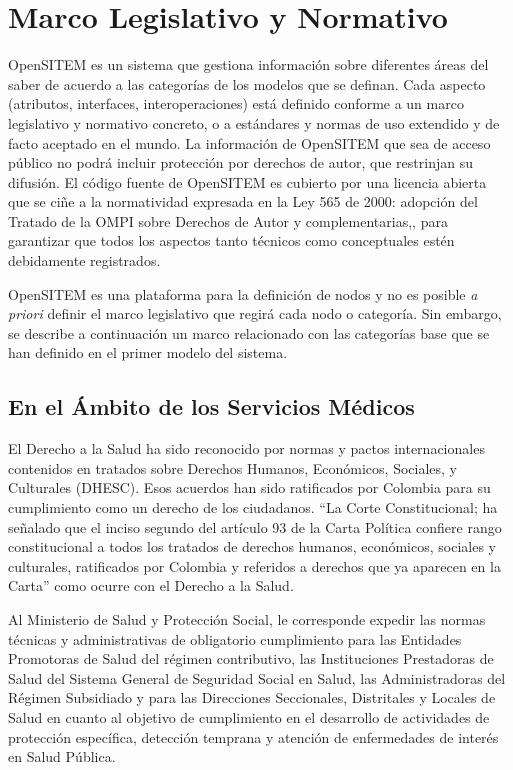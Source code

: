 \section{Marco Legislativo y Normativo}

OpenSITEM es un sistema que gestiona información sobre diferentes áreas del saber de acuerdo a las categorías de los modelos que se definan. Cada aspecto (atributos, interfaces, interoperaciones) está definido conforme a un marco legislativo y normativo concreto, o a estándares y normas de  uso extendido y de facto aceptado en el mundo. La información de OpenSITEM que sea de acceso público no podrá incluir protección por derechos de autor\cite{congreso565},\cite{congreso23} que restrinjan su difusión. El código fuente de OpenSITEM es cubierto por una licencia abierta que se ciñe a la normatividad expresada en la Ley 565 de 2000: adopción del Tratado de la OMPI sobre Derechos de Autor y complementarias\cite{congreso565},\cite{congreso44},\cite{congreso1360} para garantizar que todos los aspectos tanto técnicos como conceptuales estén debidamente registrados. 

OpenSITEM es una plataforma para la definición de nodos y no es posible \textit{a priori} definir el marco legislativo que regirá cada nodo o categoría. Sin embargo, se describe a continuación un marco relacionado con las categorías base que se han definido en el primer modelo del sistema.

\subsection{En el Ámbito de los Servicios Médicos}

El Derecho a la Salud ha sido reconocido por normas y pactos internacionales contenidos en tratados sobre Derechos Humanos, Económicos, Sociales, y Culturales  (DHESC). Esos acuerdos han sido ratificados por Colombia para su cumplimiento como un derecho de los ciudadanos. “La Corte Constitucional; ha señalado que el inciso segundo del artículo 93 de la Carta Política confiere rango constitucional a todos los tratados de derechos humanos, económicos,  sociales y culturales, ratificados por Colombia y referidos a derechos que ya aparecen en la Carta” \cite{sentencia1319} como ocurre con el Derecho a la Salud. 

Al Ministerio de Salud y Protección Social, le corresponde expedir las normas técnicas y administrativas de obligatorio cumplimiento para las Entidades Promotoras de Salud del régimen contributivo, las Instituciones Prestadoras de Salud del Sistema General de Seguridad Social en Salud, las Administradoras del Régimen Subsidiado y para las Direcciones Seccionales, Distritales y Locales de Salud en cuanto al objetivo de cumplimiento en el desarrollo de actividades de protección específica, detección temprana y atención de enfermedades de interés en Salud Pública. 

